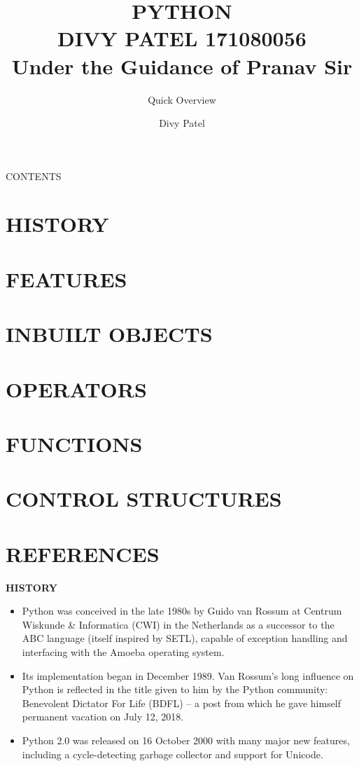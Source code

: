 \documentclass{beamer}
\title{
 PYTHON\\ DIVY PATEL 171080056\\ Under the Guidance of Pranav Sir} %
\subtitle{Quick Overview} %
\author{Divy Patel}
\begin{document}
  \frame{\maketitle}
 \begin{darkframes}
    \begin{frame}{CONTENTS}
    \tableofcontents
    \section{HISTORY}
    \section{FEATURES}
    \section{INBUILT OBJECTS}
    \section{OPERATORS}
    \section{FUNCTIONS}
    \section{CONTROL STRUCTURES}
    \section{REFERENCES}
    \end{frame}
    
     \begin{frame}{ \textbf{HISTORY}}
        \begin{itemize}
         \item Python was conceived in the late 1980s by Guido van Rossum at Centrum Wiskunde & Informatica (CWI) in the Netherlands as a successor to the ABC language (itself inspired by SETL), capable of exception handling and interfacing with the Amoeba operating system. 
         \item Its implementation began in December 1989. Van Rossum's long influence on Python is reflected in the title given to him by the Python community: Benevolent Dictator For Life (BDFL) – a post from which he gave himself permanent vacation on July 12, 2018.
         \item Python 2.0 was released on 16 October 2000 with many major new features, including a cycle-detecting garbage collector and support for Unicode.
        \end{itemize}
    \end{frame}
    

\end{darkframes}
\end{document}

